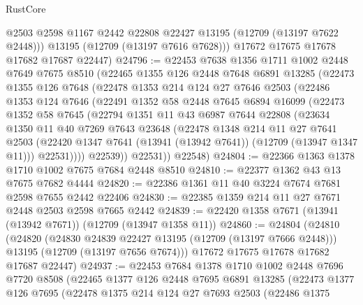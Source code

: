 \begin{lexlean}{RustCore}
\begin{coremodule}
          @2503
          @2598
          @1167
          @2442
          @22808
          @22427
          @13195
          (@12709 (@13197 @7622 @2448)))
        @13195
        (@12709 (@13197 @7616 @7628)))
      @17672
      @17675
      @17678
      @17682
      @17687
      @22447)
@24796 := @22453
    @7638
    @1356
    @1711
    @1002
    @2448
    @7649
    @7675
    @8510
    (@22465
      @1355
      @126
      @2448
      @7648
      @6891
      @13285
      (@22473
        @1355
        @126
        @7648
        (@22478
          @1353
          @214
          @124
          @27
          @7646
          @2503
          (@22486
            @1353
            @124
            @7646
            (@22491
              @1352
              @58
              @2448
              @7645
              @6894
              @16099
              (@22473
                @1352
                @58
                @7645
                (@22794
                  @1351
                  @11
                  @43
                  @6987
                  @7644
                  @22808
                  (@23634
                    @1350
                    @11
                    @40
                    @7269
                    @7643
                    @23648
                    (@22478
                      @1348
                      @214
                      @11
                      @27
                      @7641
                      @2503
                      (@22420 @1347 @7641 (@13941 (@13942 @7641)) (@12709 (@13947 @1347 @11)))
                      @22531))))
              @22539))
          @22531))
      @22548)
@24804 := @22366 @1363 @1378 @1710 @1002 @7675 @7684 @2448 @8510
@24810 := @22377 @1362 @43 @13 @7675 @7682 @4444
@24820 := @22386 @1361 @11 @40 @3224 @7674 @7681 @2598 @7655 @2442 @22406
@24830 := @22385 @1359 @214 @11 @27 @7671 @2448 @2503 @2598 @7665 @2442
@24839 := @22420 @1358 @7671 (@13941 (@13942 @7671)) (@12709 (@13947 @1358 @11))
@24860 := @24804
    (@24810
      (@24820
        (@24830 @24839 @22427 @13195 (@12709 (@13197 @7666 @2448)))
        @13195
        (@12709 (@13197 @7656 @7674)))
      @17672
      @17675
      @17678
      @17682
      @17687
      @22447)
@24937 := @22453
    @7684
    @1378
    @1710
    @1002
    @2448
    @7696
    @7720
    @8508
    (@22465
      @1377
      @126
      @2448
      @7695
      @6891
      @13285
      (@22473
        @1377
        @126
        @7695
        (@22478
          @1375
          @214
          @124
          @27
          @7693
          @2503
          (@22486
            @1375

\end{coremodule}
\end{lexlean}
